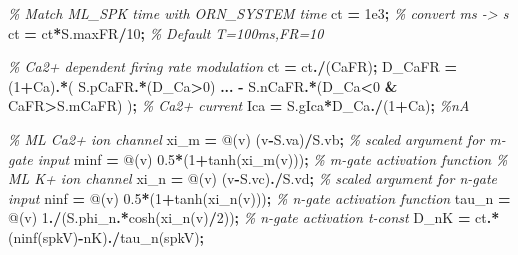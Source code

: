 \documentclass[
]{article}
\newenvironment{Shaded}{\begin{snugshade}}{\end{snugshade}}
\newcommand{\CommentTok}[1]{\textcolor[rgb]{0.56,0.35,0.01}{\textit{#1}}}
\newcommand{\FloatTok}[1]{\textcolor[rgb]{0.00,0.00,0.81}{#1}}
\newcommand{\FunctionTok}[1]{\textcolor[rgb]{0.00,0.00,0.00}{#1}}
\newcommand{\NormalTok}[1]{#1}
\newcommand{\OperatorTok}[1]{\textcolor[rgb]{0.81,0.36,0.00}{\textbf{#1}}}
\begin{document}
\begin{Shaded}
\begin{Highlighting}[]
        \CommentTok{\% Match ML\_SPK time with ORN\_SYSTEM time}
\NormalTok{        ct }\OperatorTok{=} \FloatTok{1e3}\OperatorTok{;} \CommentTok{\% convert ms {-}\textgreater{} s }
\NormalTok{        ct }\OperatorTok{=}\NormalTok{ ct}\OperatorTok{*}\NormalTok{S.maxFR}\OperatorTok{/}\FloatTok{10}\OperatorTok{;} \CommentTok{\% Default T=100ms,FR=10}

        \CommentTok{\% Ca2+ dependent firing rate modulation}
\NormalTok{        ct }\OperatorTok{=}\NormalTok{ ct}\OperatorTok{./}\NormalTok{(CaFR)}\OperatorTok{;}
\NormalTok{        D\_CaFR }\OperatorTok{=}\NormalTok{ (}\FloatTok{1}\OperatorTok{+}\NormalTok{Ca)}\OperatorTok{.*}\NormalTok{( S.pCaFR}\OperatorTok{.*}\NormalTok{(D\_Ca}\OperatorTok{\textgreater{}}\FloatTok{0}\NormalTok{) }\OperatorTok{...}
        \OperatorTok{{-}}\NormalTok{ S.nCaFR}\OperatorTok{.*}\NormalTok{(D\_Ca}\OperatorTok{\textless{}}\FloatTok{0} \OperatorTok{\&}\NormalTok{ CaFR}\OperatorTok{\textgreater{}}\NormalTok{S.mCaFR) )}\OperatorTok{;}
        \CommentTok{\% Ca2+ current}
\NormalTok{        Ica }\OperatorTok{=}\NormalTok{ S.gIca}\OperatorTok{*}\NormalTok{D\_Ca}\OperatorTok{./}\NormalTok{(}\FloatTok{1}\OperatorTok{+}\NormalTok{Ca)}\OperatorTok{;} \CommentTok{\%nA}

        \CommentTok{\% ML Ca2+ ion channel}
\NormalTok{        xi\_m    }\OperatorTok{=}\NormalTok{ @(v) (v}\OperatorTok{{-}}\NormalTok{S.va)}\OperatorTok{/}\NormalTok{S.vb}\OperatorTok{;}                   \CommentTok{\% scaled argument for m{-}gate input}
\NormalTok{        minf    }\OperatorTok{=}\NormalTok{ @(v) }\FloatTok{0.5}\OperatorTok{*}\NormalTok{(}\FloatTok{1}\OperatorTok{+}\FunctionTok{tanh}\NormalTok{(xi\_m(v)))}\OperatorTok{;}       \CommentTok{\% m{-}gate activation function    }
        \CommentTok{\% ML K+ ion channel}
\NormalTok{        xi\_n    }\OperatorTok{=}\NormalTok{ @(v) (v}\OperatorTok{{-}}\NormalTok{S.vc)}\OperatorTok{./}\NormalTok{S.vd}\OperatorTok{;}                   \CommentTok{\% scaled argument for n{-}gate input}
\NormalTok{        ninf    }\OperatorTok{=}\NormalTok{ @(v) }\FloatTok{0.5}\OperatorTok{*}\NormalTok{(}\FloatTok{1}\OperatorTok{+}\FunctionTok{tanh}\NormalTok{(xi\_n(v)))}\OperatorTok{;}       \CommentTok{\% n{-}gate activation function}
\NormalTok{        tau\_n   }\OperatorTok{=}\NormalTok{ @(v) }\FloatTok{1}\OperatorTok{./}\NormalTok{(S.phi\_n}\OperatorTok{.*}\FunctionTok{cosh}\NormalTok{(xi\_n(v)}\OperatorTok{/}\FloatTok{2}\NormalTok{))}\OperatorTok{;}  \CommentTok{\% n{-}gate activation t{-}const}
\NormalTok{        D\_nK }\OperatorTok{=}\NormalTok{ ct}\OperatorTok{.*}\NormalTok{(ninf(spkV)}\OperatorTok{{-}}\NormalTok{nK)}\OperatorTok{./}\NormalTok{tau\_n(spkV)}\OperatorTok{;}


\end{Highlighting}
\end{Shaded}
\end{document}
